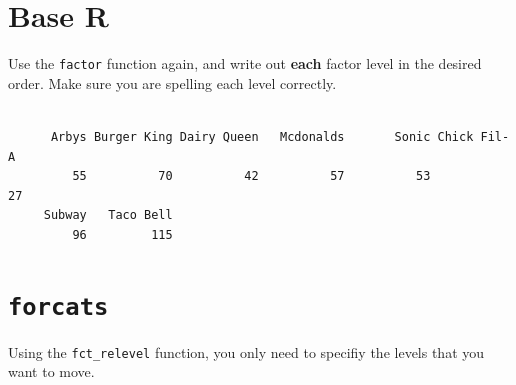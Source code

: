 \documentclass[
  letterpaper,
  DIV=11,
  numbers=noendperiod,
  oneside]{scrreprt}
\newenvironment{Shaded}{\begin{snugshade}}{\end{snugshade}}
\newcommand{\AttributeTok}[1]{\textcolor[rgb]{0.40,0.45,0.13}{#1}}
\newcommand{\CommentTok}[1]{\textcolor[rgb]{0.37,0.37,0.37}{#1}}
\newcommand{\FunctionTok}[1]{\textcolor[rgb]{0.28,0.35,0.67}{#1}}
\newcommand{\NormalTok}[1]{\textcolor[rgb]{0.00,0.23,0.31}{#1}}
\newcommand{\SpecialCharTok}[1]{\textcolor[rgb]{0.37,0.37,0.37}{#1}}
\newcommand{\StringTok}[1]{\textcolor[rgb]{0.13,0.47,0.30}{#1}}
\begin{document}
\section{Base R}

Use the \texttt{factor} function again, and write out \textbf{each}
factor level in the desired order. Make sure you are spelling each level
correctly.

\begin{Shaded}
\end{Shaded}

\begin{verbatim}

      Arbys Burger King Dairy Queen   Mcdonalds       Sonic Chick Fil-A 
         55          70          42          57          53          27 
     Subway   Taco Bell 
         96         115 
\end{verbatim}

\section{\texorpdfstring{\texttt{forcats}}{forcats}}

Using the \texttt{fct\_relevel} function, you only need to specifiy the
levels that you want to move.

\begin{Shaded}
\end{Shaded}
\end{document}
